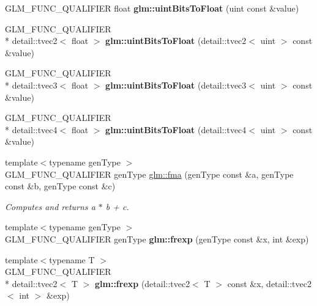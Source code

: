 \begin{DoxyCompactItemize}
\item 
\hypertarget{namespaceglm_aa621d0e67181e4ccd5588259bcc393ab}{G\-L\-M\-\_\-\-F\-U\-N\-C\-\_\-\-Q\-U\-A\-L\-I\-F\-I\-E\-R float {\bfseries glm\-::uint\-Bits\-To\-Float} (uint const \&value)}\label{namespaceglm_aa621d0e67181e4ccd5588259bcc393ab}

\item 
\hypertarget{namespaceglm_a5ce140553687f4d212a18f472972c543}{G\-L\-M\-\_\-\-F\-U\-N\-C\-\_\-\-Q\-U\-A\-L\-I\-F\-I\-E\-R \\*
detail\-::tvec2$<$ float $>$ {\bfseries glm\-::uint\-Bits\-To\-Float} (detail\-::tvec2$<$ uint $>$ const \&value)}\label{namespaceglm_a5ce140553687f4d212a18f472972c543}

\item 
\hypertarget{namespaceglm_ac96c797cb01d4d6db5a0b5537b56697b}{G\-L\-M\-\_\-\-F\-U\-N\-C\-\_\-\-Q\-U\-A\-L\-I\-F\-I\-E\-R \\*
detail\-::tvec3$<$ float $>$ {\bfseries glm\-::uint\-Bits\-To\-Float} (detail\-::tvec3$<$ uint $>$ const \&value)}\label{namespaceglm_ac96c797cb01d4d6db5a0b5537b56697b}

\item 
\hypertarget{namespaceglm_a8facefb72a43a5283824d120347b6537}{G\-L\-M\-\_\-\-F\-U\-N\-C\-\_\-\-Q\-U\-A\-L\-I\-F\-I\-E\-R \\*
detail\-::tvec4$<$ float $>$ {\bfseries glm\-::uint\-Bits\-To\-Float} (detail\-::tvec4$<$ uint $>$ const \&value)}\label{namespaceglm_a8facefb72a43a5283824d120347b6537}

\item 
{\footnotesize template$<$typename gen\-Type $>$ }\\G\-L\-M\-\_\-\-F\-U\-N\-C\-\_\-\-Q\-U\-A\-L\-I\-F\-I\-E\-R gen\-Type \hyperlink{group__core__func__common_gae88b926eebc4d610ecdd148bf8c7bdac}{glm\-::fma} (gen\-Type const \&a, gen\-Type const \&b, gen\-Type const \&c)
\begin{DoxyCompactList}\small\item\em Computes and returns a $\ast$ b + c. \end{DoxyCompactList}\item 
\hypertarget{namespaceglm_a3fab9fc606511c1751ff2173afccaa6e}{{\footnotesize template$<$typename gen\-Type $>$ }\\G\-L\-M\-\_\-\-F\-U\-N\-C\-\_\-\-Q\-U\-A\-L\-I\-F\-I\-E\-R gen\-Type {\bfseries glm\-::frexp} (gen\-Type const \&x, int \&exp)}\label{namespaceglm_a3fab9fc606511c1751ff2173afccaa6e}

\item 
\hypertarget{namespaceglm_a2816d346bb147ce8e9d54d5c01acb790}{{\footnotesize template$<$typename T $>$ }\\G\-L\-M\-\_\-\-F\-U\-N\-C\-\_\-\-Q\-U\-A\-L\-I\-F\-I\-E\-R \\*
detail\-::tvec2$<$ T $>$ {\bfseries glm\-::frexp} (detail\-::tvec2$<$ T $>$ const \&x, detail\-::tvec2$<$ int $>$ \&exp)}\label{namespaceglm_a2816d346bb147ce8e9d54d5c01acb790}


\end{DoxyCompactItemize}
